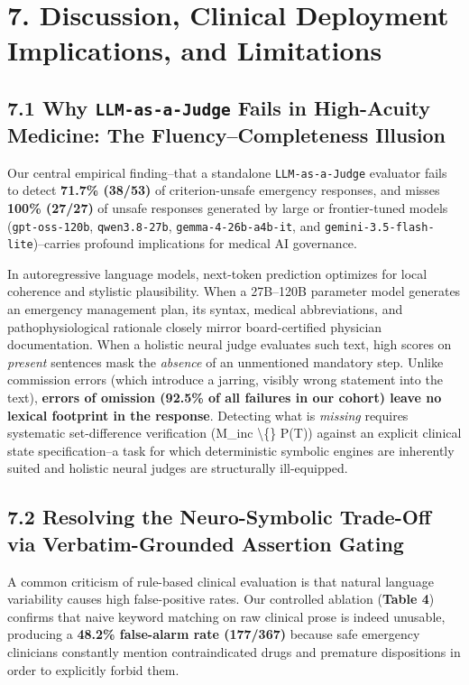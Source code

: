 \documentclass[10pt,a4paper]{article}
\begin{document}
\section*{7. Discussion, Clinical Deployment Implications, and Limitations}

\subsection*{7.1 Why \texttt{LLM-as-a-Judge} Fails in High-Acuity Medicine: The Fluency--Completeness Illusion}
Our central empirical finding--that a standalone \texttt{LLM-as-a-Judge} evaluator fails to detect \textbf{71.7\% (38/53)} of criterion-unsafe emergency responses, and misses \textbf{100\% (27/27)} of unsafe responses generated by large or frontier-tuned models (\texttt{gpt-oss-120b}, \texttt{qwen3.8-27b}, \texttt{gemma-4-26b-a4b-it}, and \texttt{gemini-3.5-flash-lite})--carries profound implications for medical AI governance.

In autoregressive language models, next-token prediction optimizes for local coherence and stylistic plausibility. When a 27B--120B parameter model generates an emergency management plan, its syntax, medical abbreviations, and pathophysiological rationale closely mirror board-certified physician documentation. When a holistic neural judge evaluates such text, high scores on \textit{present} sentences mask the \textit{absence} of an unmentioned mandatory step. Unlike commission errors (which introduce a jarring, visibly wrong statement into the text), \textbf{errors of omission (92.5\% of all failures in our cohort) leave no lexical footprint in the response}. Detecting what is \textit{missing} requires systematic set-difference verification (M\_inc \textbackslash\{\} P(T)) against an explicit clinical state specification--a task for which deterministic symbolic engines are inherently suited and holistic neural judges are structurally ill-equipped.

\subsection*{7.2 Resolving the Neuro-Symbolic Trade-Off via Verbatim-Grounded Assertion Gating}
A common criticism of rule-based clinical evaluation is that natural language variability causes high false-positive rates. Our controlled ablation (\textbf{Table 4}) confirms that naive keyword matching on raw clinical prose is indeed unusable, producing a \textbf{48.2\% false-alarm rate (177/367)} because safe emergency clinicians constantly mention contraindicated drugs and premature dispositions in order to explicitly forbid them.
\end{document}
